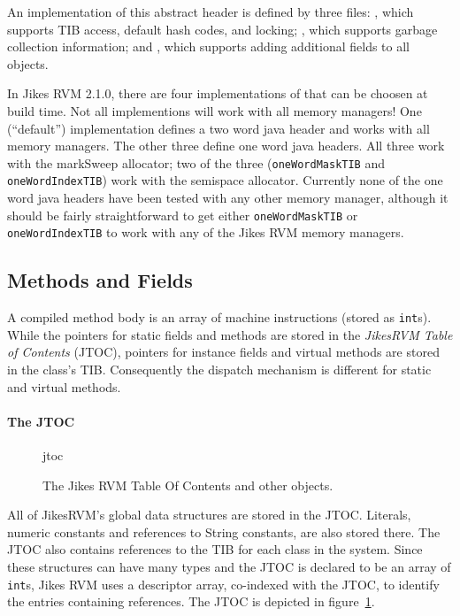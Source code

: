 An implementation of this abstract header is defined by three files: 
, which supports
TIB access, default hash codes, and locking; 
, which
supports garbage collection information; 
and 
, which supports
adding additional fields to all objects. 

In Jikes RVM 2.1.0, there are four implementations of 
 that can be
choosen at build time.  Not all implementions will work with all memory
managers!  One (``default'') implementation defines a two word java
header and works with all memory managers. The other three define one
word java headers.  All three work with the markSweep allocator; two
of the three ({\tt oneWordMaskTIB} and {\tt oneWordIndexTIB}) work
with the semispace allocator.  Currently none of the one word java
headers have been tested with any other memory manager, although it should
be fairly straightforward to get either {\tt oneWordMaskTIB} or {\tt
oneWordIndexTIB} to work with any of the Jikes RVM memory managers. 

\JavaTMFooter

\JikesTMFooter

\subsection{Methods and Fields}\label{sssec:methods}
A compiled method body is an array of machine instructions (stored as
{\tt int}s). 
While the pointers for static fields and methods are stored in the 
{\em JikesRVM Table of Contents} (JTOC),
pointers for instance fields and virtual methods are stored in the class's TIB.
Consequently the dispatch mechanism is different for static and virtual 
methods.

\paragraph{The JTOC}
\begin{figure}[htb]
\begin{gif}{jtoc}
\vbox{
\hbox{}
}\hfil
\end{gif}
\caption{The Jikes RVM Table Of Contents and other objects.}
\label{fig:jtoc}
\end{figure}
All of Jikes\trademark RVM's global data structures are stored in the JTOC. 
Literals, numeric
constants and references to String constants, are also stored there.
The JTOC also
contains references to the TIB for each class in the system.  
Since these 
structures can have many types and the JTOC is declared to be an array of 
{\tt int}s,  
Jikes RVM uses a descriptor array, co-indexed with the JTOC, 
to identify the entries containing references.
The JTOC
is depicted in figure~\ref{fig:jtoc}.  

